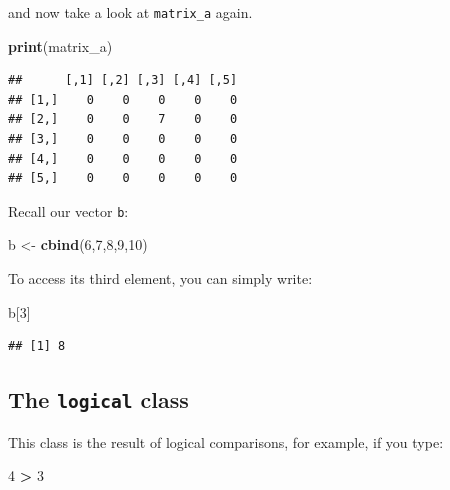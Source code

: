 \documentclass[]{gitbook}
\newenvironment{Shaded}{\begin{snugshade}}{\end{snugshade}}
\newcommand{\DecValTok}[1]{\textcolor[rgb]{0.00,0.00,0.81}{#1}}
\newcommand{\KeywordTok}[1]{\textcolor[rgb]{0.13,0.29,0.53}{\textbf{#1}}}
\newcommand{\NormalTok}[1]{#1}
\newcommand{\OperatorTok}[1]{\textcolor[rgb]{0.81,0.36,0.00}{\textbf{#1}}}
\newcommand{\StringTok}[1]{\textcolor[rgb]{0.31,0.60,0.02}{#1}}
\theoremstyle{definition}
\theoremstyle{definition}
\theoremstyle{definition}
\theoremstyle{remark}
\begin{document}
and now take a look at \texttt{matrix\_a} again.

\begin{Shaded}
\begin{Highlighting}[]
\KeywordTok{print}\NormalTok{(matrix_a)}
\end{Highlighting}
\end{Shaded}

\begin{verbatim}
##      [,1] [,2] [,3] [,4] [,5]
## [1,]    0    0    0    0    0
## [2,]    0    0    7    0    0
## [3,]    0    0    0    0    0
## [4,]    0    0    0    0    0
## [5,]    0    0    0    0    0
\end{verbatim}

Recall our vector \texttt{b}:

\begin{Shaded}
\begin{Highlighting}[]
\NormalTok{b <-}\StringTok{ }\KeywordTok{cbind}\NormalTok{(}\DecValTok{6}\NormalTok{,}\DecValTok{7}\NormalTok{,}\DecValTok{8}\NormalTok{,}\DecValTok{9}\NormalTok{,}\DecValTok{10}\NormalTok{)}
\end{Highlighting}
\end{Shaded}

To access its third element, you can simply write:

\begin{Shaded}
\begin{Highlighting}[]
\NormalTok{b[}\DecValTok{3}\NormalTok{]}
\end{Highlighting}
\end{Shaded}

\begin{verbatim}
## [1] 8
\end{verbatim}

\hypertarget{the-logical-class}{%
\subsection{\texorpdfstring{The \texttt{logical}
class}{The logical class}}\label{the-logical-class}}

This class is the result of logical comparisons, for example, if you
type:

\begin{Shaded}
\begin{Highlighting}[]
\DecValTok{4} \OperatorTok{>}\StringTok{ }\DecValTok{3}
\end{Highlighting}
\end{Shaded}
\end{document}
